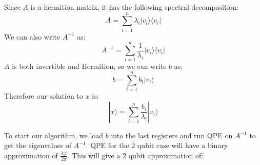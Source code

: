 \documentclass[12pt]{article}
\begin{document}
Since $A$ is a hermition matrix, it has the following spectral decomposition:
\[
A = \sum_{i=1}^n \lambda_i |v_i\rangle \langle v_i|
\]
We can also write $A^{-1}$ as:
\[
A^{-1} = \sum_{i=1}^n \frac{1}{\lambda_i} |v_i\rangle \langle v_i|
\]
$A$ is both invertible and Hermition, so we can write $b$ as:
\[
b = \sum_{i=1}^n b_i |v_i\rangle
\]
Therefore our solution to $x$ is:
\[
|x\rangle = \sum_{i=1}^n \frac{b_i}{\lambda_i} |v_i\rangle
\]

To start our algorithm, we load $b$ into the last registers and run QPE on $A^{-1}$ to get the eigenvalues of $A^{-1}$.
QPE for the 2 qubit case will have a binary approximation of $\frac{\lambda_i t}{2\pi}$. This will give a 2 qubit approximation
of:
\end{document}

